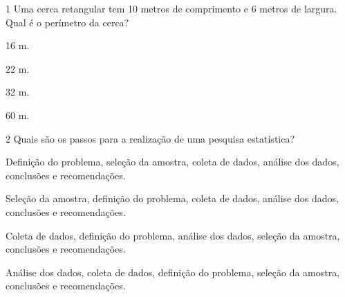 \num{1} Uma cerca retangular tem 10 metros de comprimento e 6 metros de
largura. Qual é o perímetro da cerca?

\begin{escolha}
\item 16 m.
\item 22 m.
\item 32 m.
\item 60 m.
\end{escolha}







\num{2} Quais são os passos para a realização de uma pesquisa estatística?

\begin{escolha}
\item Definição do problema, seleção da amostra, coleta de dados, análise
dos dados, conclusões e recomendações.
\item Seleção da amostra, definição do problema, coleta de dados, análise
dos dados, conclusões e recomendações.
\item Coleta de dados, definição do problema, análise dos dados, seleção da
amostra, conclusões e recomendações.
\item Análise dos dados, coleta de dados, definição do problema, seleção da
amostra, conclusões e recomendações.
\end{escolha}




